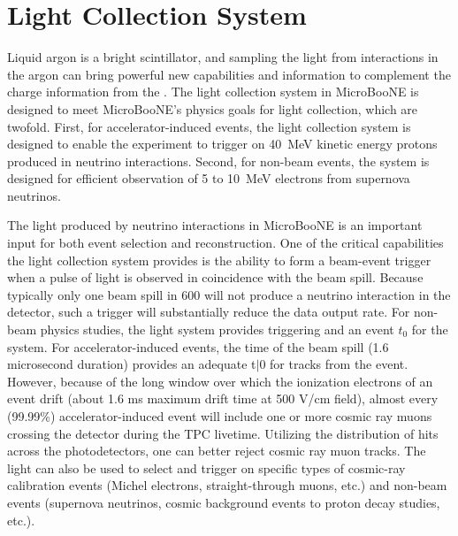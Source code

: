 
%

\section{Light Collection System}
\label{sec:light-collection}

Liquid argon is a bright scintillator, and sampling the light from interactions in the argon can bring powerful new capabilities and information to complement the charge information from the \lartpc.  The light collection system in MicroBooNE is designed to meet MicroBooNE's physics goals for light collection, which are twofold.  First, for accelerator-induced events, the light collection system is designed to enable the experiment to trigger on 40~MeV kinetic energy protons produced in neutrino interactions.  Second, for non-beam events,  the system is designed for efficient observation of 5 to 10~MeV electrons from supernova neutrinos.   

The light produced by neutrino interactions in MicroBooNE is an important input for both event selection and reconstruction.  
One of the critical capabilities the light collection system provides is the ability to form a beam-event trigger when a pulse of light is observed in coincidence with the beam spill.  Because typically only one beam spill in 600 will not produce a neutrino interaction in the detector, such a trigger will substantially reduce the data output rate.  
For non-beam physics studies, the light system provides triggering and an event $t_0$ for the \lartpc system.   For accelerator-induced events, the time of the beam spill (1.6 microsecond duration) provides an adequate t$|0$ for tracks from the event.  However, because of the long window over which the ionization electrons of an event drift (about 1.6 ms maximum drift time at 500 V/cm field), almost every (99.99\%) accelerator-induced event will include one or more cosmic ray muons crossing the detector during the TPC livetime.  Utilizing the distribution of hits across the photodetectors, one can better reject cosmic ray muon tracks.  
The light can also be used to select and trigger on specific types of cosmic-ray calibration events (Michel electrons, straight-through muons, etc.) and non-beam events (supernova neutrinos, cosmic background events to proton decay studies, etc.).


